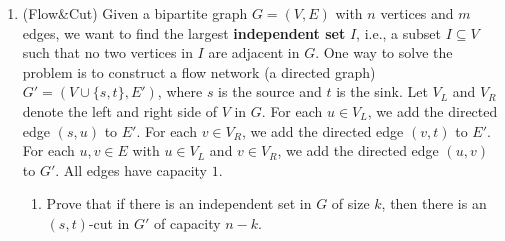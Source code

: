 \documentclass[12pt,a4paper]{article}
\theoremstyle{definition}
\begin{document}
\begin{enumerate}
\begin{enumerate}
\begin{algorithm}[H]
        Let $comp[v]$ be the SCC id of vertex $v$, and $m$ be the number of SCCs\;
        Compute them using Algorithm~\ref{Algorithm Tarjan}\;
        \BlankLine
        Initialize array $W[1\dots m] \leftarrow 0$\;
        Create a new DAG $G' = (V', E')$ where:
            \begin{itemize}
                \item $V' = \{1, 2, \dots, m\}$ (one vertex per SCC)
                \item For each $(x, y) \in E$ with $comp[x] \neq comp[y]$, add edge $(comp[x], comp[y])$ to $E'$
            \end{itemize}
        \BlankLine
        $start \leftarrow comp[u]$\;
        $result \leftarrow$ \textsc{MaxPointsInDAG}($G'$, $start$, $W$)\;
        output $result$\;
    \end{algorithm}
    \end{enumerate}
    

    \item {\color{purple}(Flow\&Cut)} Given a bipartite graph $G = (V, E)$ with $n$ vertices and $m$ edges, we want to find the largest \textbf{independent set} $I$, i.e., a subset $I \subseteq V$ such that no two vertices in $I$ are adjacent in $G$. One way to solve the problem is to construct a flow network (a directed graph) $G′ = (V \cup\{s, t\}, E')$, where $s$ is the source and $t$ is the sink. Let $V_L$ and $V_R$ denote the left and right side of $V$ in $G$. For each $u \in V_L$, we add the directed edge $(s, u)$ to $E'$. For each $v \in V_R$, we add the directed edge $(v, t)$ to $E'$. For each $u,v \in E$ with $u \in V_L$ and $v \in V_R$, we add the directed edge $(u, v)$ to $G'$. All edges have capacity $1$. 
    \begin{enumerate}
        \item Prove that if there is an independent set in $G$ of size $k$, then there is an $(s, t)$-cut in $G'$ of capacity $n − k$.


\end{enumerate}
\end{enumerate}
\end{document}
